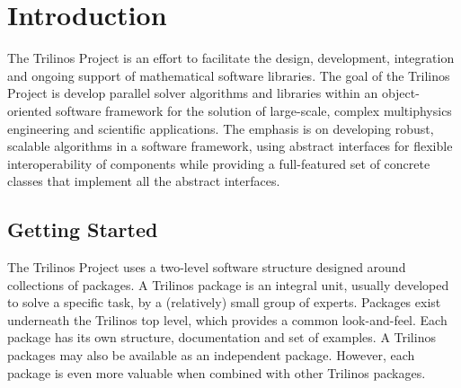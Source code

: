 % 
% 
% 
%  
%  
% 

\section{Introduction}

The Trilinos Project is an effort to facilitate the design, development,
integration and ongoing support of mathematical software libraries.  The
goal of the Trilinos Project is develop parallel solver algorithms and
libraries within an object-oriented software framework for the solution
of large-scale, complex multiphysics engineering and scientific
applications. The emphasis is on developing robust, scalable algorithms
in a software framework, using abstract interfaces for flexible
interoperability of components while providing a full-featured set of
concrete classes that implement all the abstract interfaces.


\subsection{Getting Started}
\label{sec:getting}

The Trilinos Project uses a two-level software structure designed around
collections of packages. A Trilinos package is an integral unit, usually
developed to solve a specific task, by a (relatively) small group of
experts.  Packages exist underneath the Trilinos top level, which
provides a common look-and-feel. Each package has its own structure,
documentation and set of examples. A Trilinos packages may also be
available as an independent package. However, each package is even more
valuable when combined with other Trilinos packages.

